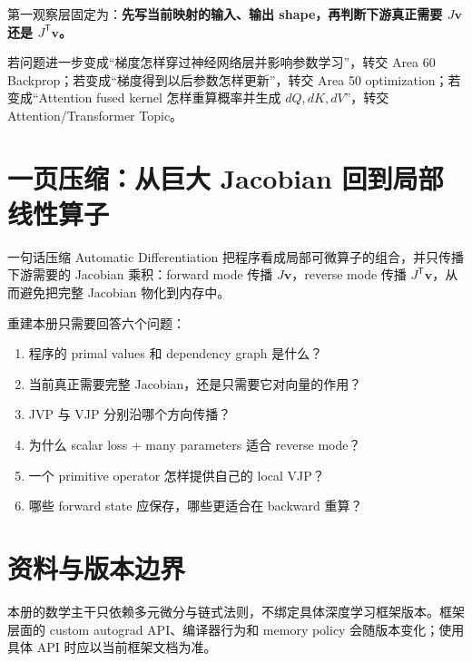 \documentclass[profile=standard,twoside=false]{ipara-handbook}
\begin{document}
第一观察层固定为：\textbf{先写当前映射的输入、输出 shape，再判断下游真正需要 $J\boldsymbol{v}$ 还是 $J^{\mathsf T}\boldsymbol{v}$。}

若问题进一步变成“梯度怎样穿过神经网络层并影响参数学习”，转交 Area 60 Backprop；若变成“梯度得到以后参数怎样更新”，转交 Area 50 optimization；若变成“Attention fused kernel 怎样重算概率并生成 $dQ,dK,dV$”，转交 Attention/Transformer Topic。

\section{一页压缩：从巨大 Jacobian 回到局部线性算子}

\begin{mentalmodel}{一句话压缩}
Automatic Differentiation 把程序看成局部可微算子的组合，并只传播下游需要的 Jacobian 乘积：forward mode 传播 $J\boldsymbol{v}$，reverse mode 传播 $J^{\mathsf T}\boldsymbol{v}$，从而避免把完整 Jacobian 物化到内存中。
\end{mentalmodel}

重建本册只需要回答六个问题：

\begin{enumerate}
  \item 程序的 primal values 和 dependency graph 是什么？
  \item 当前真正需要完整 Jacobian，还是只需要它对向量的作用？
  \item JVP 与 VJP 分别沿哪个方向传播？
  \item 为什么 scalar loss + many parameters 适合 reverse mode？
  \item 一个 primitive operator 怎样提供自己的 local VJP？
  \item 哪些 forward state 应保存，哪些更适合在 backward 重算？
\end{enumerate}

\section{资料与版本边界}

本册的数学主干只依赖多元微分与链式法则，不绑定具体深度学习框架版本。框架层面的 custom autograd API、编译器行为和 memory policy 会随版本变化；使用具体 API 时应以当前框架文档为准。
\end{document}
